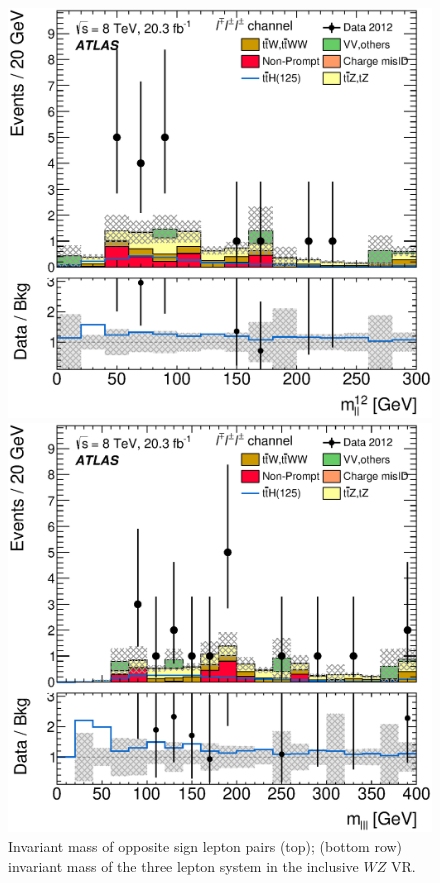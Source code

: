 \begin{figure}[!htbp]
\begin{minipage}[h]{0.4\textwidth}
  \end{minipage}\hfill
  \begin{minipage}[h]{0.4\textwidth}
    \centering \includegraphics[width=\textwidth]{figs/results/results_new/3lep_SR_SortLepPair12Mll}
  \end{minipage}\hfill
  \begin{minipage}[h]{0.4\textwidth}
    \centering \includegraphics[width=\textwidth]{figs/results/results_new/3lep_SR_Mlll}
  \end{minipage}\hfill
  \caption{Invariant mass of opposite sign lepton pairs (top); (bottom row) invariant mass
    of the three lepton system in the inclusive $WZ$ VR. 
}
  \label{fig:SR3l_mll}
\end{figure} 



